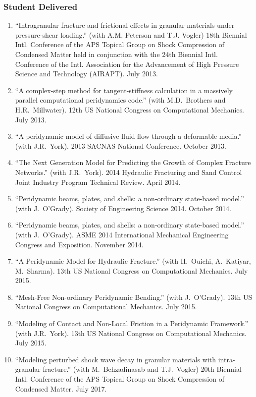 \subsubsection*{Student Delivered}

\ifdefined\iscockrell
\begin{enumerate}
  \item ``Intragranular fracture and frictional effects in granular materials under pressure-shear loading.'' (with A.M. Peterson and T.J. Vogler) 18th Biennial Intl. Conference of the APS Topical Group on Shock Compression of Condensed Matter held in conjunction with the 24th Biennial Intl. Conference of the Intl. Association for the Advancement of High Pressure Science and Technology (AIRAPT). July 2013.
  \item ``A complex-step method for tangent-stiffness calculation in a massively parallel computational peridynamics code.'' (with M.D.~Brothers and H.R.~Millwater). 12th US National Congress on Computational Mechanics. July 2013.
  \item ``A peridynamic model of diffusive fluid flow through a deformable media.'' (with J.R.~York). 2013 SACNAS National Conference. October 2013.
  \item ``The Next Generation Model for Predicting the Growth of Complex Fracture Networks.'' (with J.R.~York). 2014 Hydraulic Fracturing and Sand Control Joint Industry Program Technical Review.  April 2014.
  \item ``Peridynamic beams, plates, and shells: a non-ordinary state-based model.'' (with J.~O'Grady). Society of Engineering Science 2014. October 2014.
  \item ``Peridynamic beams, plates, and shells: a non-ordinary state-based model.'' (with J.~O'Grady). ASME 2014 International Mechanical Engineering Congress and Exposition. November 2014.
  \item ``A Peridynamic Model for Hydraulic Fracture.'' (with H.~Ouichi, A.~Katiyar, M.~Sharma). 13th US National Congress on Computational Mechanics. July 2015.
  \item ``Mesh-Free Non-ordinary Peridynamic Bending.'' (with J.~O'Grady). 13th US National Congress on Computational Mechanics. July 2015.
  \item ``Modeling of Contact and Non-Local Friction in a Peridynamic Framework.'' (with J.R.~York). 13th US National Congress on Computational Mechanics. July 2015.
  \item ``Modeling perturbed shock wave decay in granular materials with intra-granular fracture.'' (with M.\ Behzadinasab and T.J.\ Vogler) 20th Biennial Intl. Conference of the APS Topical Group on Shock Compression of Condensed Matter. July 2017.

\end{enumerate}
